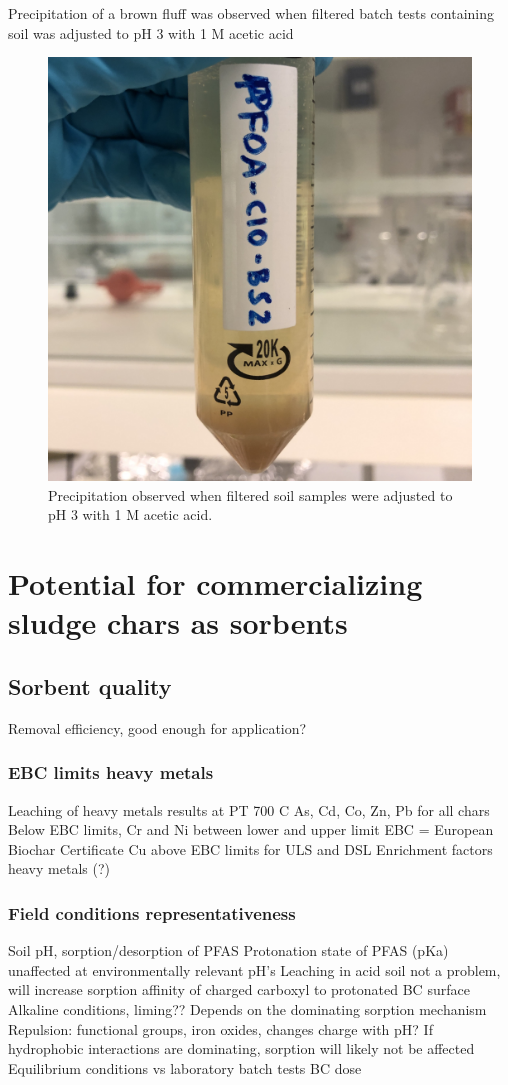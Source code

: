 Precipitation of a brown fluff was observed when filtered batch tests containing soil was adjusted to pH 3 with 1 M acetic acid

\begin{figure}
    \centering
    \includegraphics[width=0.6\linewidth,scale=0.6]{Bilder/Samples/Precipitation.jpg}
    \caption{Precipitation observed when filtered soil samples were adjusted to pH 3 with 1 M acetic acid.}
    \label{fig:precip}
\end{figure}

\section{Potential for commercializing sludge chars as sorbents}
\subsection{Sorbent quality}
Removal efficiency, good enough for application?
\subsubsection{EBC limits heavy metals}
Leaching of heavy metals results at PT 700 C
    As, Cd, Co, Zn, Pb for all chars Below EBC limits, Cr and Ni between lower and upper limit
    EBC = European Biochar Certificate
    Cu above EBC limits for ULS and DSL
    Enrichment factors heavy metals (?)

\subsubsection{Field conditions representativeness}
Soil pH, sorption/desorption of PFAS
Protonation state of PFAS (pKa) unaffected at environmentally relevant pH’s
Leaching in acid soil not a problem, will increase sorption affinity of charged carboxyl to protonated BC surface
Alkaline conditions, liming?? 
    Depends on the dominating sorption mechanism
    Repulsion: functional groups, iron oxides, changes charge with pH?
    If hydrophobic interactions are dominating, sorption will likely not be affected
Equilibrium conditions vs laboratory batch tests
BC dose

